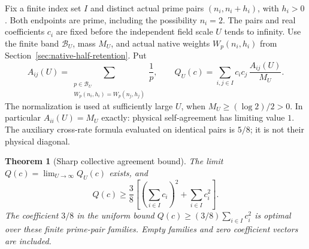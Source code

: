 \documentclass[11pt]{article}
\newtheorem{theorem}{Theorem}[section]
\begin{document}
Fix a finite index set \(I\) and distinct actual prime pairs
\((n_i,n_i+h_i)\), with \(h_i>0\). Both endpoints are prime, including
the possibility \(n_i=2\). The pairs and real coefficients \(c_i\)
are fixed before the independent field scale \(U\) tends to infinity.
Use the finite band \(\mathcal B_U\), mass \(M_U\), and actual native
weights \(W_p(n_i,h_i)\) from Section~\ref{sec:native-half-retention}.
Put
\[
 A_{ij}(U)=
 \sum_{\substack{p\in\mathcal B_U\\W_p(n_i,h_i)=W_p(n_j,h_j)}}\frac1p,
 \qquad
 Q_U(c)=\sum_{i,j\in I}c_ic_j\,\frac{A_{ij}(U)}{M_U}.
\]
The normalization is used at sufficiently large \(U\), when
\(M_U\ge(\log2)/2>0\). In particular \(A_{ii}(U)=M_U\)
exactly: physical self-agreement has limiting value \(1\).
The auxiliary cross-rate formula evaluated on identical pairs is
\(5/8\); it is not their physical diagonal.

\begin{theorem}[Sharp collective agreement bound]
\label{thm:native-agreement-energy}
The limit \(Q(c)=\lim_{U\to\infty}Q_U(c)\) exists, and
\begin{equation}
 Q(c)\ge\frac38\left[
       \left(\sum_{i\in I}c_i\right)^2+\sum_{i\in I}c_i^2
                         \right].
 \label{eq:native-agreement-energy}
\end{equation}
The coefficient \(3/8\) in the uniform bound
\(Q(c)\ge(3/8)\sum_{i\in I}c_i^2\) is optimal over these finite
prime-pair families. Empty families and zero coefficient vectors
are included.
\end{theorem}
\end{document}
